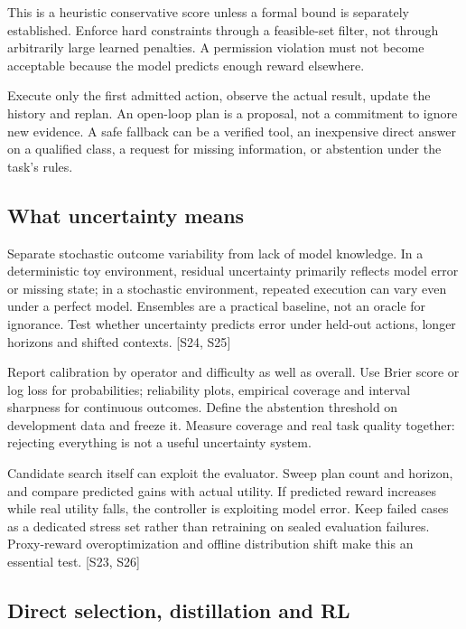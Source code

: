 \documentclass[
  11pt,
  a4paper,
]{article}
\begin{document}
This is a heuristic conservative score unless a formal bound is
separately established. Enforce hard constraints through a feasible-set
filter, not through arbitrarily large learned penalties. A permission
violation must not become acceptable because the model predicts enough
reward elsewhere.

Execute only the first admitted action, observe the actual result,
update the history and replan. An open-loop plan is a proposal, not a
commitment to ignore new evidence. A safe fallback can be a verified
tool, an inexpensive direct answer on a qualified class, a request for
missing information, or abstention under the task's rules.

\subsection{What uncertainty means}\label{what-uncertainty-means}

Separate stochastic outcome variability from lack of model knowledge. In
a deterministic toy environment, residual uncertainty primarily reflects
model error or missing state; in a stochastic environment, repeated
execution can vary even under a perfect model. Ensembles are a practical
baseline, not an oracle for ignorance. Test whether uncertainty predicts
error under held-out actions, longer horizons and shifted contexts.
{[}S24, S25{]}

Report calibration by operator and difficulty as well as overall. Use
Brier score or log loss for probabilities; reliability plots, empirical
coverage and interval sharpness for continuous outcomes. Define the
abstention threshold on development data and freeze it. Measure coverage
and real task quality together: rejecting everything is not a useful
uncertainty system.

Candidate search itself can exploit the evaluator. Sweep plan count and
horizon, and compare predicted gains with actual utility. If predicted
reward increases while real utility falls, the controller is exploiting
model error. Keep failed cases as a dedicated stress set rather than
retraining on sealed evaluation failures. Proxy-reward overoptimization
and offline distribution shift make this an essential test. {[}S23,
S26{]}

\subsection{Direct selection, distillation and
RL}\label{direct-selection-distillation-and-rl}
\end{document}
